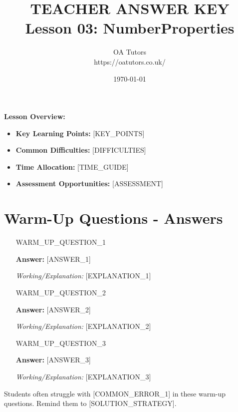 \documentclass[a4paper,12pt]{article}
\begin{document}
\title{\textcolor{oared}{\Huge TEACHER ANSWER KEY} \\ 
       \textcolor{oablue}{\Large Lesson 03: NumberProperties}}
\author{\textcolor{oablue}{OA Tutors} \\ 
        \textcolor{oagray}{https://oatutors.co.uk/}}
\date{\textcolor{oagray}{\today}}

\maketitle

\begin{teachingtip}
\textbf{Lesson Overview:}
\begin{itemize}
    \item \textbf{Key Learning Points:} [KEY_POINTS]
    \item \textbf{Common Difficulties:} [DIFFICULTIES]
    \item \textbf{Time Allocation:} [TIME_GUIDE]
    \item \textbf{Assessment Opportunities:} [ASSESSMENT]
\end{itemize}
\end{teachingtip}

\section{Warm-Up Questions - Answers}

\begin{enumerate}
    \item [WARM_UP_QUESTION_1]
    
    \textcolor{oared}{\textbf{Answer:} [ANSWER_1]}
    
    \textit{Working/Explanation:} [EXPLANATION_1]
    
    \item [WARM_UP_QUESTION_2]
    
    \textcolor{oared}{\textbf{Answer:} [ANSWER_2]}
    
    \textit{Working/Explanation:} [EXPLANATION_2]
    
    \item [WARM_UP_QUESTION_3]
    
    \textcolor{oared}{\textbf{Answer:} [ANSWER_3]}
    
    \textit{Working/Explanation:} [EXPLANATION_3]
\end{enumerate}

\begin{commonerror}
Students often struggle with [COMMON_ERROR_1] in these warm-up questions. 
Remind them to [SOLUTION_STRATEGY].
\end{commonerror}
\end{document}
